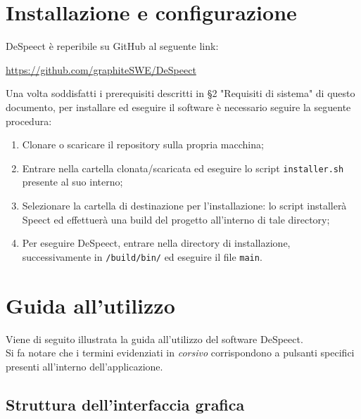 \documentclass[openany,12pt,a4paper]{report}
\begin{document}
	 
	\chapter{Installazione e configurazione} 
	
	DeSpeect è reperibile su GitHub al seguente link:
	\begin{center}
		\url{https://github.com/graphiteSWE/DeSpeect}
	\end{center}
	
	\noindent Una volta soddisfatti i prerequisiti descritti in §2 "Requisiti di sistema" di questo documento, per installare ed eseguire il software è necessario seguire la seguente procedura:
	\begin{enumerate}
		\item Clonare o scaricare il repository sulla propria macchina;
		\item Entrare nella cartella clonata/scaricata ed eseguire lo script \verb|installer.sh| presente al suo interno;
		\item Selezionare la cartella di destinazione per l'installazione: lo script installerà Speect ed effettuerà una build del progetto all'interno di tale directory;
		\item Per eseguire DeSpeect, entrare nella directory di installazione, successivamente in \verb|/build/bin/| ed eseguire il file \verb|main|.
	\end{enumerate}
	
	\chapter{Guida all'utilizzo}
	Viene di seguito illustrata la guida all'utilizzo del software DeSpeect. \\
	Si fa notare che i termini evidenziati in \textit{corsivo} corrispondono a pulsanti specifici presenti all'interno dell'applicazione.
	
	\section{Struttura dell'interfaccia grafica}
	
\end{document}
